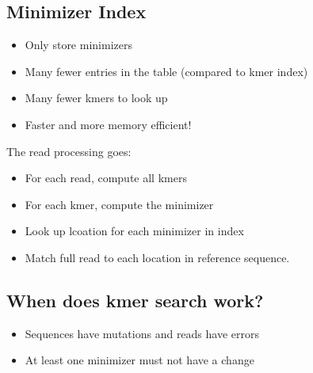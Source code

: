 \documentclass[10pt]{article}
\begin{document}
\subsection*{Minimizer Index}
\begin{itemize}
    \item Only store minimizers
    \item Many fewer entries in the table (compared to kmer index)
    \item Many fewer kmers to look up
    \item Faster and more memory efficient!
\end{itemize}
The read processing goes:
\begin{itemize}
    \item For each read, compute all kmers
    \item For each kmer, compute the minimizer
    \item Look up lcoation for each minimizer in index
    \item Match full read to each location in reference sequence.
\end{itemize}

\subsection*{When does kmer search work?}
\begin{itemize}
    \item Sequences have mutations and reads have errors
    \item At least one minimizer must not have a change
\end{itemize}
\end{document}
